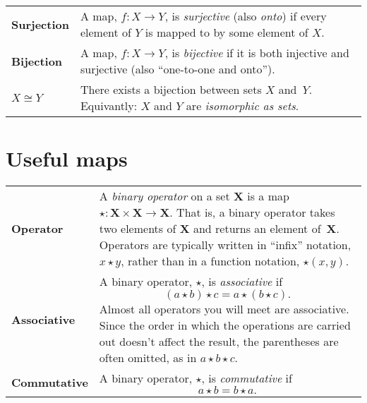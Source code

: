 \documentclass[10pt, a4paper, landscape]{article}
\newcommand{\defn}[1]{\textbf{#1}}
\newcommand{\set}[1]{\mathbold{#1}}
\begin{document}
\begin{multicols*}{3}
\begin{tabularx}{\columnwidth}{@{}l>{\raggedright\arraybackslash}X@{}}
  \defn{Surjection} & A map, $f\colon X \to Y$, is \emph{surjective} (also \emph{onto}) if every element of $Y$ is mapped to by some element of $X$. \\

  \defn{Bijection} & A map, $f\colon X \to Y$, is \emph{bijective} if it
  is both injective and surjective (also “one-to-one and onto”). \\

  $X\cong Y$ & There exists a bijection between sets $X$ and~$Y$. Equivantly: $X$ and $Y$ are \emph{isomorphic as sets}. 
\end{tabularx}



\section*{Useful maps}
\begin{tabularx}{\columnwidth}{@{}l>{\raggedright\arraybackslash}X@{}}
  \toprule
  \defn{Operator} & A \emph{binary operator} on a set $\set{X}$ is a map $\star \colon \set{X}\times\set{X} \to \set{X}$. That is, a binary operator takes two elements of $\set{X}$ and returns an element of~$\set{X}$. Operators are typically written in “infix” notation, $x\star y$, rather than in a function notation, $\star(x,y)$. \\

  \defn{Associative} & A binary operator, $\star$, is \emph{associative} if
  \begin{equation*}
    (a \star b) \star c = a \star (b \star c).
  \end{equation*}
  Almost all operators you will meet are associative. Since the order in which the operations are carried out doesn't affect the result, the parentheses are often omitted, as in $a\star b\star c$.\\
  
  \defn{Commutative} & A binary operator, $\star$, is \emph{commutative} if
  \begin{equation*}
    a \star b = b \star a.
  \end{equation*}
\end{tabularx}



\end{multicols*}
\end{document}
